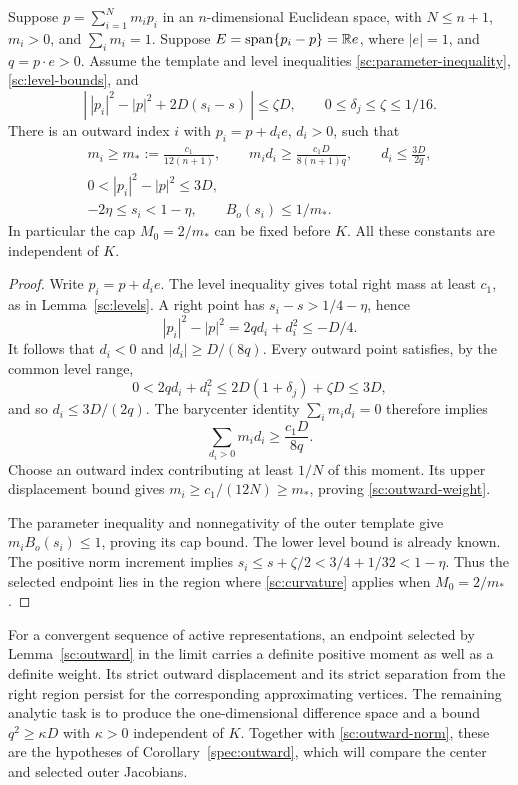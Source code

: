 \begin{lemma}\label{sc:outward}
Suppose $p=\sum_{i=1}^N m_ip_i$ in an $n$-dimensional Euclidean
space, with $N\leq n+1$, $m_i>0$, and $\sum_i m_i=1$.
Suppose $E=\operatorname{span}\{p_i-p\}=\mathbb R e$, where $|e|=1$, and
$q=p\cdot e>0$.
Assume the template and level inequalities
\eqref{sc:parameter-inequality}, \eqref{sc:level-bounds}, and
\[
 \left|\ |p_i|^2-|p|^2+2D(s_i-s)\ \right|\leq\zeta D,\qquad
 0\leq\delta_j\leq\zeta\leq1/16.
\]
There is an outward index $i$ with $p_i=p+d_i e$, $d_i>0$, such that
\begin{gather}
 m_i\geq m_*:=\frac{c_1}{12(n+1)},\qquad
 m_id_i\geq\frac{c_1D}{8(n+1)q},\qquad
 d_i\leq\frac{3D}{2q},                         \label{sc:outward-weight}\\
 0<|p_i|^2-|p|^2\leq3D,                       \label{sc:outward-norm}\\
 -2\eta\leq s_i<1-\eta,\qquad B_o(s_i)\leq1/m_*.
                                                        \label{sc:outward-cap}
\end{gather}
In particular the cap $M_0=2/m_*$ can be fixed before $K$.
All these constants are independent of $K$.
\end{lemma}

\begin{proof}
Write $p_i=p+d_i e$.  The level inequality gives total right mass
at least $c_1$, as in Lemma~\ref{sc:levels}.
A right point has $s_i-s>1/4-\eta$, hence
\[
 |p_i|^2-|p|^2=2qd_i+d_i^2\leq-D/4.
\]
It follows that $d_i<0$ and $|d_i|\geq D/(8q)$.
Every outward point satisfies, by the common level range,
\[
 0<2qd_i+d_i^2\leq2D(1+\delta_j)+\zeta D\leq3D,
\]
and so $d_i\leq3D/(2q)$.
The barycenter identity $\sum_i m_id_i=0$ therefore implies
\[
 \sum_{d_i>0}m_id_i\geq\frac{c_1D}{8q}.
\]
Choose an outward index contributing at least $1/N$ of this moment.
Its upper displacement bound gives $m_i\geq c_1/(12N)\geq m_*$,
proving \eqref{sc:outward-weight}.

The parameter inequality and nonnegativity of the outer template give
$m_iB_o(s_i)\leq1$, proving its cap bound.
The lower level bound is already known.  The positive norm increment
implies $s_i\leq s+\zeta/2<3/4+1/32<1-\eta$.
Thus the selected endpoint lies in the region where
\eqref{sc:curvature} applies when $M_0=2/m_*$.
\end{proof}

For a convergent sequence of active representations, an endpoint
selected by Lemma~\ref{sc:outward} in the limit carries a definite
positive moment as well as a definite weight.  Its strict outward
displacement and its strict separation from the right region persist
for the corresponding approximating vertices.  The remaining analytic
task is to produce the
one-dimensional difference space and a bound $q^2\geq\kappa D$ with
$\kappa>0$ independent of $K$. Together with
\eqref{sc:outward-norm}, these are the hypotheses of
Corollary~\ref{spec:outward}, which will compare the center and selected
outer Jacobians.
